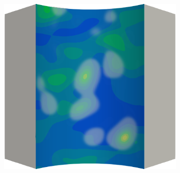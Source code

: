 \begin{figure}[!htbp]
\begin{subfigure}{0.19\textwidth}
  \end{subfigure}
  \hspace{0.06\textwidth}
  \begin{subfigure}{0.19\textwidth}
    \centering
    \includegraphics[width=\textwidth]{Chapter5/figures/spallation/ep.0009}
  \end{subfigure}
  

\end{figure}
